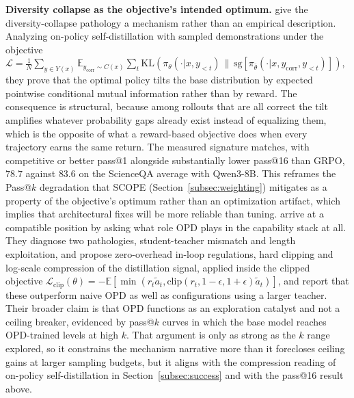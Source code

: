 \documentclass{article} %
\newcommand{\E}{\mathbb{E}}
\begin{document}
\textbf{Diversity collapse as the objective's intended optimum.} \citet{2606.26091} give the diversity-collapse pathology a mechanism rather than an empirical description. Analyzing on-policy self-distillation with sampled demonstrations under the objective $\mathcal{L} = \frac{1}{N}\sum_{y \in Y(x)} \E_{y_{\text{corr}} \sim C(x)} \sum_t \mathrm{KL}(\pi_\theta(\cdot|x,y_{<t}) \,\|\, \mathrm{sg}[\pi_{\bar\theta}(\cdot|x,y_{\text{corr}},y_{<t})])$, they prove that the optimal policy tilts the base distribution by expected pointwise conditional mutual information rather than by reward. The consequence is structural, because among rollouts that are all correct the tilt amplifies whatever probability gaps already exist instead of equalizing them, which is the opposite of what a reward-based objective does when every trajectory earns the same return. The measured signature matches, with competitive or better pass@1 alongside substantially lower pass@16 than GRPO, $78.7$ against $83.6$ on the ScienceQA average with Qwen3-8B. This reframes the Pass@$k$ degradation that SCOPE (Section~\ref{subsec:weighting}) mitigates as a property of the objective's optimum rather than an optimization artifact, which implies that architectural fixes will be more reliable than tuning. \citet{2607.13399} arrive at a compatible position by asking what role OPD plays in the capability stack at all. They diagnose two pathologies, student-teacher mismatch and length exploitation, and propose zero-overhead in-loop regulations, hard clipping and log-scale compression of the distillation signal, applied inside the clipped objective $\mathcal{L}_{\text{clip}}(\theta) = -\E[\min(r_t \tilde{a}_t, \mathrm{clip}(r_t, 1-\epsilon, 1+\epsilon)\tilde{a}_t)]$, and report that these outperform naive OPD as well as configurations using a larger teacher. Their broader claim is that OPD functions as an exploration catalyst and not a ceiling breaker, evidenced by pass@$k$ curves in which the base model reaches OPD-trained levels at high $k$. That argument is only as strong as the $k$ range explored, so it constrains the mechanism narrative more than it forecloses ceiling gains at larger sampling budgets, but it aligns with the compression reading of on-policy self-distillation in Section~\ref{subsec:success} and with the pass@16 result above.
\end{document}
